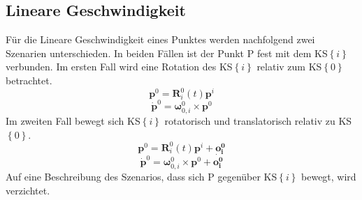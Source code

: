 \subsection{Lineare Geschwindigkeit}
Für die Lineare Geschwindigkeit eines Punktes werden nachfolgend zwei Szenarien unterschieden. In beiden Fällen ist der Punkt P fest mit dem KS$\left\{i\right\}$ verbunden. Im ersten Fall wird eine Rotation des KS$\left\{i\right\}$ relativ zum KS$\left\{0\right\}$ betrachtet. 
\begin{equation}
	\bm{p}^0 = \bm{R}^0_i(t)\bm{p}^i
\end{equation}
%
\begin{equation}
	\dot{\bm{p}}^0 = \bm{\omega}^0_{0,i}\times\bm{p}^0
\end{equation}
%
Im zweiten Fall bewegt sich KS$\left\{i\right\}$ rotatorisch und translatorisch relativ zu KS$\left\{0\right\}$. 
\begin{equation}
	\bm{p}^0 = \bm{R}^0_i(t)\bm{p}^i + \bm{o^0_i}
\end{equation}
%
\begin{equation}
	\dot{\bm{p}}^0 = \bm{\omega}^0_{0,i}\times\bm{p}^0 + \dot{\bm{o^0_i}}
\end{equation}
Auf eine Beschreibung des Szenarios, dass sich P gegenüber KS$\left\{i\right\}$ bewegt, wird verzichtet.
%
